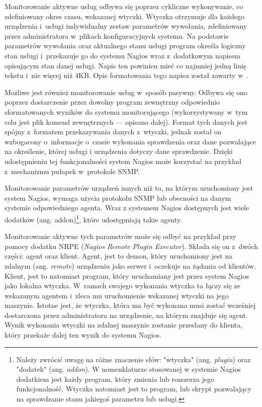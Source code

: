 Monitorowanie aktywne usług odbywa się poprzez cykliczne wykonywanie,
co zdefiniowany okres czasu, wskazanej wtyczki. Wtyczka otrzymuje dla
każdego urządzenia i~usługi indywidualny zestaw parametrów wywołania,
zdefiniowany przez administratora w~plikach konfiguracyjnych
systemu. Na podstawie parametrów wywołania oraz aktualnego stanu
usługi program określa logiczny stan usługi i~przekazuje go do systemu
Nagios wraz z~dodatkowym napisem opisującym stan danej usługi. Napis
ten powinien mieć co najmniej jedną linię tekstu i~nie więcej niż
4KB. Opis formatowania tego napisu został zawarty
w~\cite{www:NagiosPluginsTutorial}. 

Możliwe jest również monitorowanie usług w~sposób pasywny. Odbywa się
ono poprzez dostarczenie przez dowolny program zewnętrzny odpowiednio
sformatowanych wyników do systemu monitorującego (wykorzystywany w~tym
celu jest plik komend zewnętrznych --- opisano dalej). Format tych
danych jest spójny z~formatem przekazywania danych z~wtyczki, jednak
został on wzbogacony o~informacje o~czasie wykonania sprawdzenia oraz
dane pozwalające na określenie, której usługi i urządzenia dotyczy
dane sprawdzenie. Dzięki udostępnieniu tej funkcjonalności system
Nagios może korzystać na przykład z~mechanizmu pułapek w~protokole
SNMP.

Monitorowanie parametrów urządzeń innych niż to, na którym uruchomiony
jest system Nagios, wymaga użycia protokołu SNMP lub obecności na
danym systemie odpowiedniego agenta. Wraz z systemem Nagios dostępnych
jest wiele dodatków (ang. addon)\footnote{Należy zwrócić uwagę na
  różne znaczenie słów: "wtyczka" (ang. {\em plugin}) oraz "dodatek"
  (ang. {\em addon}). W nomenklaturze stosowanej w systemie Nagios
  dodatkiem jest każdy program, który zmienia lub rozszerza jego
  funkcjonalność. Wtyczka natomiast jest to program, lub skrypt
  pozwalający na sprawdzanie stanu jakiegoś parametru lub usługi.},
które udostępniają takie agenty.

Monitorowanie aktywne tych parametrów może się odbyć na przykład przy
pomocy dodatku NRPE ({\em Nagios Remote Plugin Executor}). Składa się
on z~dwóch części: agent oraz klient. Agent, jest to demon, który
uruchomiony jest na zdalnym (ang. {\em remote}) urządzeniu jako serwer
i~oczekuje na żądania od klientów. Klient, jest to natomiast program,
który uruchamiany jest przez system Nagios jako lokalna
wtyczka. W~ramach swojego wykonania wtyczka ta łączy się ze wskazanym
agentem i~zleca mu uruchomienie wskazanej wtyczki na jego
maszynie. Istotne jest, że wtyczka, która ma być wykonana musi zostać
wcześniej dostarczona przez administratora na urządzenie, na którym
znajduje się agent. Wynik wykonania wtyczki na zdalnej maszynie
zostanie przesłany do klienta, który przekaże dalej ten wynik do
systemu Nagios.

